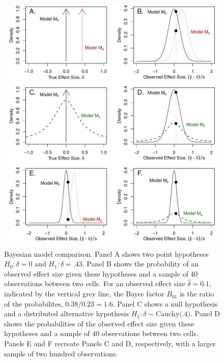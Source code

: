 \documentclass[man]{apa6}
\begin{document}
\begin{figure}
\includegraphics[width=\textwidth, keepaspectratio]{BFfigure.pdf}
\caption{Bayesian model comparison. Panel A shows two point hypotheses $H_0: \delta = 0$ and $H_1: \delta=.43$. Panel B shows the probability of an observed effect size given these hypotheses and a sample of 40 observations between two cells. For an observed effect size $\hat{\delta} = 0.1$, indicated by the vertical grey line, the Bayes factor $B_{01}$ is the ratio of the probabilites, $0.38 / 0.23 = 1.6$. Panel C shows a null hypothesis and a distributed alternative hypothesis $H_1: \delta \sim \mbox{Cauchy(.4)}$. Panel D shows the probabilities of the observed effect size given these hypotheses and a sample of 40 observations between two cells. Panels E and F recreate Panels C and D, respectively, with a larger sample of two hundred observations.}
\label{BFfig}
\end{figure}
\end{document}
